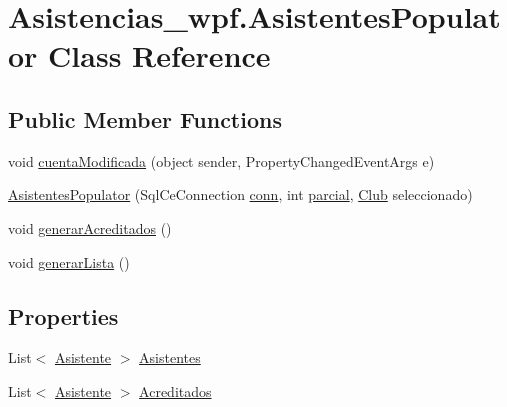 \hypertarget{class_asistencias__wpf_1_1_asistentes_populator}{\section{Asistencias\-\_\-wpf.\-Asistentes\-Populator Class Reference}
\label{class_asistencias__wpf_1_1_asistentes_populator}
}
\subsection*{Public Member Functions}
\begin{DoxyCompactItemize}
\item 
void \hyperlink{class_asistencias__wpf_1_1_asistentes_populator_ae0fd583251f55be398fff227885728e2}{cuenta\-Modificada} (object sender, Property\-Changed\-Event\-Args e)
\item 
\hyperlink{class_asistencias__wpf_1_1_asistentes_populator_a1171590ee1726952f8a8336bcfe7d8d3}{Asistentes\-Populator} (Sql\-Ce\-Connection \hyperlink{class_asistencias__wpf_1_1_asistentes_populator_aea7e955756112dc99c093514621320c7}{conn}, int \hyperlink{class_asistencias__wpf_1_1_asistentes_populator_abe2a5ad9e46aa901e8c8e9bbf03ef653}{parcial}, \hyperlink{class_asistencias__wpf_1_1_club}{Club} seleccionado)
\item 
void \hyperlink{class_asistencias__wpf_1_1_asistentes_populator_aadfe2dae3e3628d7d14dd3613ae5039b}{generar\-Acreditados} ()
\item 
void \hyperlink{class_asistencias__wpf_1_1_asistentes_populator_a93286c806b0d3ebe3ea65ec5c4b5fd8b}{generar\-Lista} ()
\end{DoxyCompactItemize}
\subsection*{Properties}
\begin{DoxyCompactItemize}
\item 
List$<$ \hyperlink{class_asistencias__wpf_1_1_asistente}{Asistente} $>$ \hyperlink{class_asistencias__wpf_1_1_asistentes_populator_aabced42abbc527d1a0426c3772546eca}{Asistentes}
\item 
List$<$ \hyperlink{class_asistencias__wpf_1_1_asistente}{Asistente} $>$ \hyperlink{class_asistencias__wpf_1_1_asistentes_populator_a5db01c3b8b78cd44c75180c2450db2c5}{Acreditados}
\end{DoxyCompactItemize}

